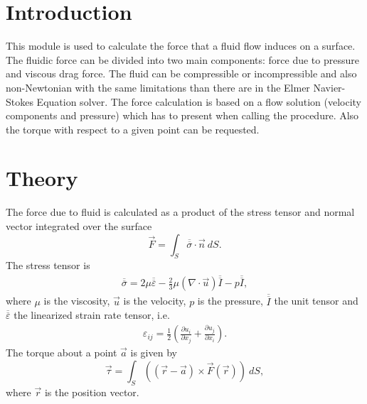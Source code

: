 
\begin{versiona}


\section{Introduction}

This module is used to calculate the force that a fluid flow induces
on a surface. The fluidic force can be divided into two main
components: force due to pressure and viscous drag force. The fluid
can be compressible or incompressible and also non-Newtonian with the
same limitations than there are in the Elmer Navier-Stokes Equation
solver. The force calculation is based on a flow solution (velocity
components and pressure) which has to present when calling the
procedure. Also the torque with respect to a given point can be
requested.


\section{Theory}

The force due to fluid is calculated as a product of the stress
tensor and normal vector integrated over the surface
\begin{equation}
\vec F = \int_S \overline{\overline\sigma}\cdot\vec n~dS.
\end{equation}
The stress tensor is
\begin{eqnarray}
\overline{\overline\sigma} = 2\mu \overline{\overline\varepsilon}
-\frac{2}{3} \mu (\nabla\cdot\vec u)\overline{\overline I} - p 
\overline{\overline I},
\end{eqnarray}
where $\mu$ is the viscosity, $\vec{u}$ is the velocity, $p$ is the
pressure, $\overline{\overline I}$ the unit tensor and
$\overline{\overline \varepsilon}$ the linearized strain rate tensor,
i.e.
\begin{eqnarray}
\varepsilon_{ij} = \frac{1}{2}\left( \frac{\partial u_i}{\partial x_j} +
\frac{\partial u_j}{\partial x_i}
\right).
\end{eqnarray}
The torque about a point $\vec a$ is given by 
\begin{equation}
\vec \tau = \int_S \left((\vec r-\vec a)\times\vec F(\vec r)\right)~dS,
\end{equation}
where $\vec r$ is the position vector.



\end{versiona}
